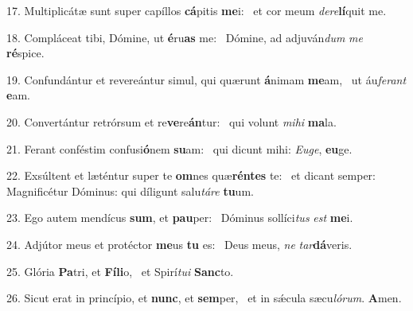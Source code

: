 17. Multiplicátæ sunt super capíllos \textbf{cá}pitis \textbf{me}i: \ast\  et cor meum \textit{de}\textit{re}\textbf{lí}quit me.\

18. Compláceat tibi, Dómine, ut \textbf{é}ru\textbf{as} me: \ast\  Dómine, ad adjuván\textit{dum} \textit{me} \textbf{ré}spice.\

19. Confundántur et revereántur simul, qui quærunt \textbf{á}nimam \textbf{me}am, \ast\  ut áu\textit{fe}\textit{rant} \textbf{e}am.\

20. Convertántur retrórsum et re\textbf{ve}re\textbf{án}tur: \ast\  qui volunt \textit{mi}\textit{hi} \textbf{ma}la.\

21. Ferant conféstim confusi\textbf{ó}nem \textbf{su}am: \ast\  qui dicunt mihi: \textit{Eu}\textit{ge}, \textbf{eu}ge.\

22. Exsúltent et læténtur super te \textbf{om}nes quæ\textbf{rén}\textbf{tes} te: \ast\  et dicant semper: Magnificétur Dóminus: qui díligunt salu\textit{tá}\textit{re} \textbf{tu}um.\

23. Ego autem mendícus \textbf{sum}, et \textbf{pau}per: \ast\  Dóminus sollíci\textit{tus} \textit{est} \textbf{me}i.\

24. Adjútor meus et protéctor \textbf{me}us \textbf{tu} es: \ast\  Deus meus, \textit{ne} \textit{tar}\textbf{dá}veris.\

25. Glória \textbf{Pa}tri, et \textbf{Fí}\textbf{li}o, \ast\  et Spirí\textit{tu}\textit{i} \textbf{Sanc}to.\

26. Sicut erat in princípio, et \textbf{nunc}, et \textbf{sem}per, \ast\  et in sǽcula sæcu\textit{ló}\textit{rum}. \textbf{A}men.\

